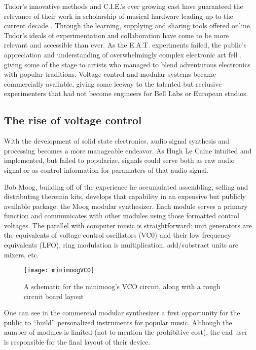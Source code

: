 \begin{itemize}
\begin{quote}
\end{quote}

Tudor’s innovative methods and C.I.E.’s ever growing cast have guaranteed the relevance of their work in scholarship of musical hardware leading up to the current decade \cite{collins2004,collins2006,collins2008,collins2010,nakai2014,driscoll2004,kuivila2004}. Through the learning, supplying and sharing tools offered online, Tudor’s ideals of experimentation and collaboration have come to be more relevant and accessible than ever. As the E.A.T. experiments failed, the public's appreciation and understanding of overwhelmingly complex electronic art fell \cite{burnham1979}, giving some of the stage to artists who managed to blend adventurous electronics with popular traditions. Voltage control and modular systems became commercially available, giving some leeway to the talented but reclusive experimenters that had not become engineers for Bell Labs or European studios. 

\subsection{The rise of voltage control}

With the development of solid state electronics, audio signal synthesis and processing becomes a more manageable endeavor. As Hugh Le Caine intuited and implemented, but failed to popularize, signals could serve both as raw audio signal or as control information for paramaters of that audio signal. 

Bob Moog, building off of the experience he accumulated assembling, selling and distributing theremin kits, develops that capability in an expensive but publicly available package: the Moog modular synthesizer. Each module serves a primary function and communicates with other modules using those formatted control voltages. The parallel with computer music is straightforward: unit generators are the equivalents of voltage control oscillators (VC0) and their low frequency equivalents (LFO), ring modulation is multiplication, add/substract units are mixers, etc. 

	\begin{figure}[h!]
	  \caption{A schematic for the minimoog's VCO circuit, along with a rough circuit board layout}
	  \centering
	    \texttt{[image: minimoogVCO]}
	\end{figure}

One can see in the commercial modular synthesizer a first opportunity for the public to ``build'' personalized instruments for popular music. Although the number of modules is limited (not to mention the prohibitive cost), the end user is responsible for the final layout of their device. 


\end{itemize}
